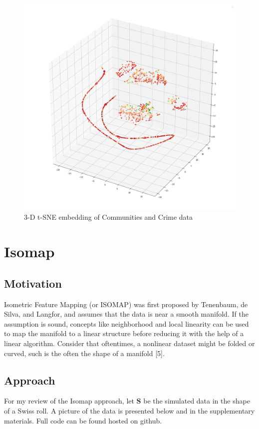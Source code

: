 \documentclass[11pt]{article}
\begin{document}
\begin{figure}[h!]
\centering
\includegraphics[scale=0.35]{3d tsne.png}
\caption{3-D t-SNE embedding of Communities and Crime data}
\label{fig: 3d t_SNE before standardizing}
\end{figure}

\section{Isomap} \label{sec: Isomap}


\subsection{Motivation}

\hspace{5mm}Isometric Feature Mapping (or ISOMAP) was first proposed by Tenenbaum, de Silva, and Langfor, and assumes that the data is near a smooth manifold. If the assumption is sound, concepts like neighborhood and local linearity can be used to map the manifold to a linear structure before reducing it with the help of a linear algorithm. Consider that oftentimes, a nonlinear dataset might be folded or curved, such is the often the shape of a manifold [5]. 


\subsection{Approach}
\hspace{5mm}For my review of the Isomap approach, let $\textbf{S}$ be the simulated data in the shape of a Swiss roll. A picture of the data is presented below and in the supplementary materials. Full code can be found hosted on github.
\end{document}
